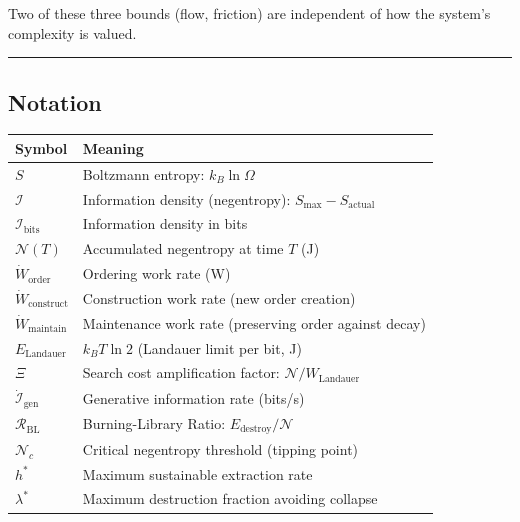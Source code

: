 \documentclass[11pt]{article}
\newcounter{none}
\begin{document}
Two of these three bounds (flow, friction) are independent of how the
system's complexity is valued.

\begin{center}\rule{0.5\linewidth}{0.5pt}\end{center}

\subsection{Notation}\label{notation}

{\def\LTcaptype{none} %
\begin{longtable}[]{@{}
  >{\raggedright\arraybackslash}p{}
  >{\raggedright\arraybackslash}p{}@{}}
\toprule\noalign{}
\begin{minipage}[b]{\linewidth}\raggedright
Symbol
\end{minipage} & \begin{minipage}[b]{\linewidth}\raggedright
Meaning
\end{minipage} \\
\midrule\noalign{}
\endhead
\bottomrule\noalign{}
\endlastfoot
\(S\) & Boltzmann entropy: \(k_B \ln \Omega\) \\
\(\mathcal{I}\) & Information density (negentropy):
\(S_{\max} - S_{\text{actual}}\) \\
\(\mathcal{I}_{\text{bits}}\) & Information density in bits \\
\(\mathcal{N}(T)\) & Accumulated negentropy at time \(T\) (J) \\
\(\dot{W}_{\text{order}}\) & Ordering work rate (W) \\
\(\dot{W}_{\text{construct}}\) & Construction work rate (new order
creation) \\
\(\dot{W}_{\text{maintain}}\) & Maintenance work rate (preserving order
against decay) \\
\(E_{\text{Landauer}}\) & \(k_B T \ln 2\) (Landauer limit per bit, J) \\
\(\Xi\) & Search cost amplification factor:
\(\mathcal{N} / W_{\text{Landauer}}\) \\
\(\dot{\mathcal{I}}_{\text{gen}}\) & Generative information rate
(bits/s) \\
\(\mathcal{R}_{\text{BL}}\) & Burning-Library Ratio:
\(E_{\text{destroy}} / \mathcal{N}\) \\
\(\mathcal{N}_c\) & Critical negentropy threshold (tipping point) \\
\(h^*\) & Maximum sustainable extraction rate \\
\(\lambda^*\) & Maximum destruction fraction avoiding collapse \\
\end{longtable}
}
\end{document}
